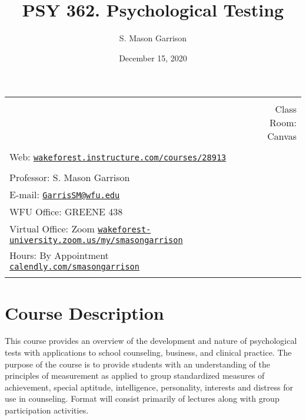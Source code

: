 \documentclass[11pt,]{article}
\title{PSY 362. Psychological Testing}
\author{S. Mason Garrison}
\date{December 15, 2020}
\begin{document}
		\maketitle
	

		\thispagestyle{firststyle}



\noindent \begin{tabular*}{\textwidth}{ @{\extracolsep{\fill}} lr @{\extracolsep{\fill}}}
\hline\\
    &  Class Room: Canvas
%
\\\hline\\
%
 Web: \href{https://wakeforest.instructure.com/courses/28913}{\tt wakeforest.instructure.com/courses/28913}&  \\ %
&  \\
Professor: S. Mason Garrison \\

E-mail: \texttt{\href{mailto:GarrisSM@wfu.edu}{\nolinkurl{GarrisSM@wfu.edu}}}  \\

WFU Office: GREENE 438   \\
Virtual Office: Zoom
\href{https://wakeforest-university.zoom.us/my/smasongarrison}{\tiny\tt wakeforest-university.zoom.us/my/smasongarrison}   \\
Hours: By Appointment
\href{https://calendly.com/smasongarrison/}{\small\tt calendly.com/smasongarrison}  \\


	&  \\
	\hline
\end{tabular*}

\vspace{2mm}

\hypertarget{course-description}{%
\section{Course Description}\label{course-description}}

This course provides an overview of the development and nature of
psychological tests with applications to school counseling, business,
and clinical practice. The purpose of the course is to provide students
with an understanding of the principles of measurement as applied to
group standardized measures of achievement, special aptitude,
intelligence, personality, interests and distress for use in counseling.
Format will consist primarily of lectures along with group participation
activities.
\end{document}
